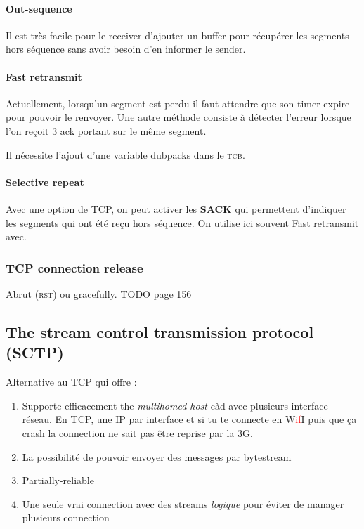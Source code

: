 \paragraph{Out-sequence}
Il est très facile pour le receiver d'ajouter un buffer pour récupérer les
segments hors séquence sans avoir besoin d'en informer le sender.

\paragraph{Fast retransmit}
Actuellement, lorsqu'un segment est perdu il faut attendre que son timer expire
pour pouvoir le renvoyer. Une autre méthode consiste à détecter l'erreur lorsque
l'on reçoit 3 ack portant sur le même segment.

Il nécessite l'ajout d'une variable dubpacks dans le \textsc{tcb}.

\paragraph{Selective repeat}
Avec une option de TCP, on peut activer les \textbf{SACK} qui permettent d'indiquer
les segments qui ont été reçu hors séquence. On utilise ici souvent Fast retransmit avec.

\subsubsection{TCP connection release}
Abrut (\textsc{rst}) ou gracefully.
TODO page 156

\subsection{The stream control transmission protocol (SCTP) }
Alternative au TCP qui offre :
\begin{enumerate}
    \item Supporte efficacement the \textit{multihomed host} càd avec plusieurs interface réseau. En TCP, une IP par interface et si tu te connecte en W\textcolor{red}{if}I puis que ça
        crash la connection ne sait pas être reprise par la 3G.
    \item La possibilité de pouvoir envoyer des messages par bytestream
    \item Partially-reliable
    \item Une seule vrai connection avec des streams \textit{logique} pour éviter de manager
        plusieurs connection
\end{enumerate}

